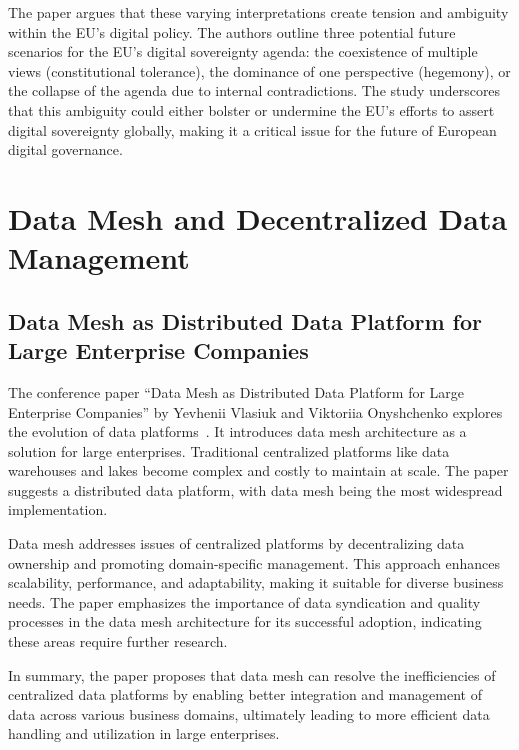 The paper argues that these varying interpretations create tension and ambiguity within the EU's digital policy.
The authors outline three potential future scenarios for the EU's digital sovereignty agenda: the coexistence of multiple views (constitutional tolerance), the dominance of one perspective (hegemony), or the collapse of the agenda due to internal contradictions.
The study underscores that this ambiguity could either bolster or undermine the EU's efforts to assert digital sovereignty globally, making it a critical issue for the future of European digital governance.

\section{Data Mesh and Decentralized Data Management}\label{sec:data-mesh-and-decentralized-data-management}

\subsection{Data Mesh as Distributed Data Platform for Large Enterprise Companies}\label{subsec:data-mesh-as-distributed-data-platform-for-large-enterprise-companies}

The conference paper ``Data Mesh as Distributed Data Platform for Large Enterprise Companies'' by Yevhenii Vlasiuk and Viktoriia Onyshchenko explores the evolution of data platforms~\cite{data_mesh}.
It introduces data mesh architecture as a solution for large enterprises.
Traditional centralized platforms like data warehouses and lakes become complex and costly to maintain at scale.
The paper suggests a distributed data platform, with data mesh being the most widespread implementation.

Data mesh addresses issues of centralized platforms by decentralizing data ownership and promoting domain-specific management.
This approach enhances scalability, performance, and adaptability, making it suitable for diverse business needs.
The paper emphasizes the importance of data syndication and quality processes in the data mesh architecture for its successful adoption, indicating these areas require further research.

In summary, the paper proposes that data mesh can resolve the inefficiencies of centralized data platforms by enabling better integration and management of data across various business domains, ultimately leading to more efficient data handling and utilization in large enterprises.

